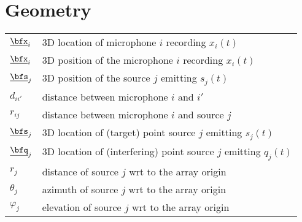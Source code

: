 
\section*{Geometry}
\begin{table}[H]
    \begin{tabular}{ll}
        $\underline{\bfx}_i$     & 3D location of microphone $i$ recording $x_i(t)$\\
        $\positionMicrophone_i$ & 3D position of the microphone $i$ recording $x_i(t)$\\
        $\positionSource_j$ & 3D position of the source $j$ emitting $s_j(t)$\\
        $d_{ii'}$   & distance between microphone $i$ and $i'$ \\
        $r_{ij}$    & distance between microphone $i$ and source $j$ \\
        $\underline{\bfs}_j$     & 3D location of (target) point source $j$ emitting $s_j(t)$\\
        $\underline{\bfq}_j$     & 3D location of (interfering) point source $j$ emitting $q_j(t)$\\
        $r_{j}$    & distance of source $j$ wrt to the array origin \\
        $\theta_{j}$    & azimuth of source $j$ wrt to the array origin\\
        $\varphi_{j}$    & elevation of source $j$ wrt to the array origin \\
    \end{tabular}
\end{table}

